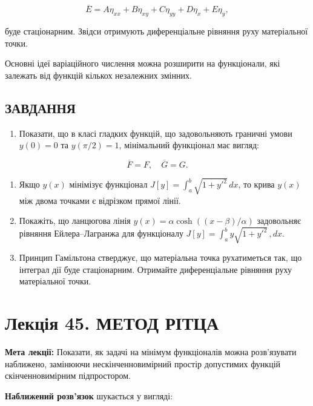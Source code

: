 \documentclass[
  ukrainian,
]{article}
\providecommand{\tightlist}{%
  \setlength{\itemsep}{0pt}\setlength{\parskip}{0pt}}
\begin{document}
\[
\overline{E} = A\eta_{xx} + B\eta_{xy} + C\eta_{yy} + D\eta_x + E\eta_y,
\]

буде стаціонарним. Звідси отримують диференціальне рівняння руху
матеріальної точки.

Основні ідеї варіаційного числення можна розширити на функціонали, які
залежать від функцій кількох незалежних змінних.

\subsection{ЗАВДАННЯ}\label{ux437ux430ux432ux434ux430ux43dux43dux44f-18}

\begin{enumerate}
\def\labelenumi{\arabic{enumi}.}
\tightlist
\item
  Показати, що в класі гладких функцій, що задовольняють граничні умови
  \(y(0)=0\) та \(y(\pi/2)=1\), мінімальний функціонал має вигляд:
\end{enumerate}

\[
\overline{F} = F, \quad \overline{G} = G.
\]

\begin{enumerate}
\def\labelenumi{\arabic{enumi}.}
\setcounter{enumi}{1}
\item
  Якщо \(y(x)\) мінімізує функціонал
  \(J[y] = \int_a^b \sqrt{1+y'^2}\, dx\), то крива \(y(x)\) між двома
  точками є відрізком прямої лінії.
\item
  Покажіть, що ланцюгова лінія \(y(x) = \alpha\cosh((x-\beta)/\alpha)\)
  задовольняє рівняння Ейлера--Лагранжа для функціоналу
  \(J[y] = \int_a^b y\sqrt{1+y'^2}\,,dx\).
\item
  Принцип Гамільтона стверджує, що матеріальна точка рухатиметься так,
  що інтеграл дії буде стаціонарним. Отримайте диференціальне рівняння
  руху матеріальної точки.
\end{enumerate}

\section{Лекція 45. МЕТОД
РІТЦА}\label{ux43bux435ux43aux446ux456ux44f-45.-ux43cux435ux442ux43eux434-ux440ux456ux442ux446ux430}

\textbf{Мета лекції:} Показати, як задачі на мінімум функціоналів можна
розв'язувати наближено, замінюючи нескінченновимірний простір допустимих
функцій скінченновимірним підпростором.

\textbf{Наближений розв'язок} шукається у вигляді:
\end{document}
